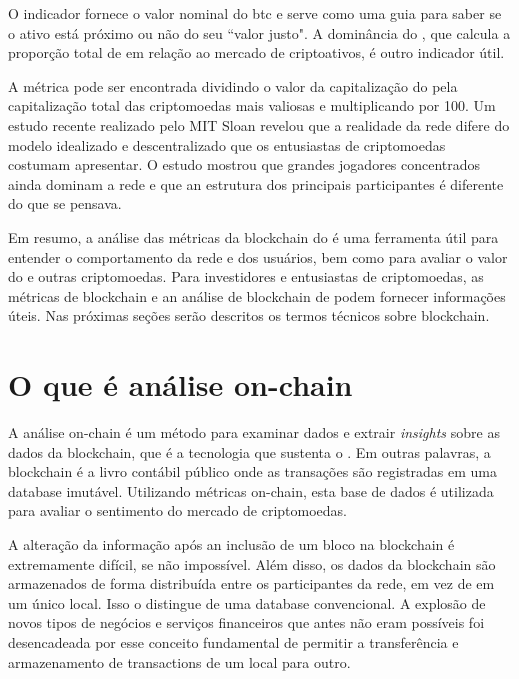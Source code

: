 \documentclass[a4paper,12pt]{article}
\newcommand{\printingbibliography}{%

    \pagestyle{myheadings}
    \markright{}
    \sloppy
    \printbibliography[heading=bibintoc, %
                   title=Bibliography %
                  ]
    \fussy%
}
\begin{document}
O indicador fornece o valor nominal do btc e serve como uma guia para saber se o ativo 
está próximo ou não do seu ``valor justo". A dominância do \btc, que calcula a proporção 
total de \btcspace em relação ao mercado de criptoativos, é outro indicador útil.

A métrica pode ser encontrada dividindo o valor da capitalização do \btcspace pela capitalização 
total das criptomoedas mais valiosas e multiplicando por 100.
Um estudo recente realizado pelo MIT Sloan revelou que a realidade da rede \btcspace difere do modelo 
idealizado e descentralizado que os entusiastas de criptomoedas costumam apresentar. O estudo 
mostrou que grandes jogadores concentrados ainda dominam a rede e que an estrutura dos principais 
participantes é diferente do que se pensava.

Em resumo, a análise das métricas da blockchain do \btcspace é uma ferramenta útil para entender 
o comportamento da rede e dos usuários, bem como para avaliar o valor do \btcspace e outras criptomoedas. 
Para investidores e entusiastas de criptomoedas, as métricas de blockchain e an análise de blockchain 
de podem fornecer informações úteis. Nas pr\'oximas se\c{c}\~oes ser\~ao descritos os termos t\'ecnicos
sobre blockchain.

\section{O que \'e an\'alise on-chain}
\hspace{0.5cm}A an\'alise on-chain é um método para examinar dados e extrair \textit{insights} 
sobre as dados da blockchain, que é a tecnologia que sustenta o \btc. Em outras palavras, a blockchain 
é a livro cont\'abil p\'ublico onde as transações são registradas em uma database imut\'avel. 
Utilizando m\'etricas on-chain, esta base de dados é utilizada para avaliar o sentimento do mercado 
de criptomoedas.

A alteração da informação após an inclusão de um bloco na blockchain é extremamente difícil, 
se não impossível. Al\'em disso, os dados da blockchain são armazenados de forma distribu\'ida 
entre os participantes da rede, em vez de em um único local. Isso o distingue de uma database convencional. 
A explosão de novos tipos de negócios e serviços financeiros que antes não eram possíveis foi desencadeada 
por esse conceito fundamental de permitir a transferência e armazenamento de transactions de um local 
para outro.


\printingbibliography
\end{document}
